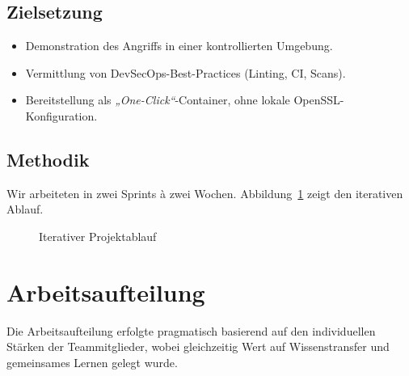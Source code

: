 \documentclass{article}
\begin{document}
\subsection{Zielsetzung}
\begin{itemize}
  \item Demonstration des Angriffs in einer kontrollierten Umgebung.
  \item Vermittlung von DevSecOps-Best-Practices (Linting, CI, Scans).
  \item Bereitstellung als \emph{„One-Click“}-Container, ohne lokale OpenSSL-Konfiguration.
\end{itemize}

\subsection{Methodik}
Wir arbeiteten in zwei Sprints à zwei Wochen.  
Abbildung~\ref{fig:process} zeigt den iterativen Ablauf.

\begin{figure}[H]
  \centering
  \caption{Iterativer Projektablauf}\label{fig:process}
\end{figure}

\section{Arbeitsaufteilung}

\noindent Die Arbeitsaufteilung erfolgte pragmatisch basierend auf den individuellen Stärken der Teammitglieder, wobei gleichzeitig Wert auf Wissenstransfer und gemeinsames Lernen gelegt wurde.
\end{document}

